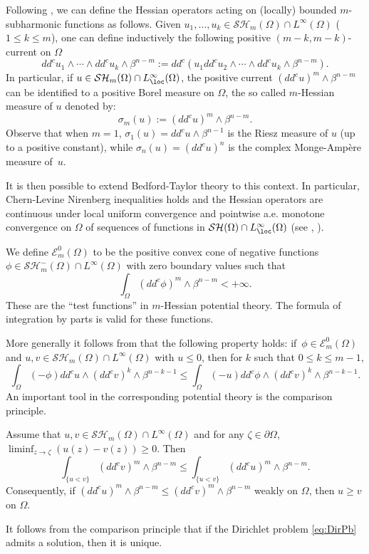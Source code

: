 Following \cite{Bl05}, we can define the Hessian operators acting on (locally) bounded $m$-subharmonic functions as follows. Given $u_1,\dots, u_k \in \mathcal{SH}_m (\Omega) \cap L^{\infty} (\Omega)$ ($1 \leq k \leq m$), one can define inductively the following positive $(m-k,m-k)$-current on $\Omega$
\[
dd^c u_1 \wedge \cdots \wedge dd^c u_k \wedge \beta^{n - m}:= dd^c (u_1 dd^c u_2 \wedge \cdots \wedge dd^c u_k \wedge \beta^{n - m}).
\]
In particular, if $u \in \mathcal{SH}_m (\Omega) \cap L^{\infty}_{\loc} (\Omega)$, the positive current $(dd^c u)^m \wedge \beta^{n-m}$ can be identified to a positive Borel measure on $\Omega$, the so called $m$-Hessian measure of $u$ denoted by:
\[
\sigma_m (u):= (dd^c u)^m \wedge \beta^{n-m}.
\]
Observe that when $m\!=\! 1$, $\sigma_1 (u) \!=\! dd^c u \wedge \beta^{n-1}$ is the Riesz measure of $u$ (up to a positive constant), while $\sigma_n (u) \!=\! (dd^c u)^n$ is the complex Monge-Ampère measure of~$u$.

It is then possible to extend Bedford-Taylor theory to this context.
In particular, Chern-Levine Nirenberg inequalities holds and the Hessian operators are continuous under local uniform convergence and pointwise a.e. monotone convergence
on $\Omega$ of sequences of functions in $\mathcal{SH} (\Omega) \cap L^{\infty}_{\loc} (\Omega)$ (see \cite{Bl05}, \cite{Lu12}).

We define $\mathcal{E}_m^0 (\Omega) $ to be the positive convex cone of negative functions $\phi \in \mathcal{SH}^-_m (\Omega) \cap L^{\infty} (\Omega)$ with zero boundary values such that
\[
\int_{\Omega} (dd^c \phi)^m \wedge \beta^{n - m} < + \infty.
\]
These are the ``test functions'' in $m$-Hessian potential theory. The formula of integration by parts is valid for these functions.

More generally it follows from \cite{Lu12,Lu15} that the following property holds: if~$\phi \in \mathcal{E}_m^0 (\Omega) $ and $u, v \in \mathcal{SH}_m (\Omega) \cap L^{\infty} (\Omega)$ with $u \leq 0$, then for $k$ such that $0 \leq k \leq m - 1$,
\begin{equation} \label{eq:testinequality}
\int_\Omega (-\phi) dd^c u \wedge (dd^c v)^k \wedge \beta^{n - k-1} \leq \int_\Omega (-u) dd^c \phi \wedge (dd^c v)^k \wedge \beta^{n - k-1}.
\end{equation}
An important tool in the corresponding potential theory is the comparison principle.

\begin{proposition} \label{prop:comparison principle}
Assume that $u,v\in \mathcal{SH}_m(\Omega)\cap L^{\infty}(\Omega)$ and for any $\zeta \in \partial \Omega$, $\liminf_{z \to \zeta }(u(z)- v(z))\geq 0$. Then
\[
\int_{\{u<v\}}(dd^c v)^m\wedge\beta^{n-m} \leq \int_{\{u<v\}}(dd^c u)^m\wedge\beta^{n-m}.
\]
Consequently, if $(dd^cu)^m\wedge\beta^{n-m}\leq(dd^cv)^m\wedge\beta^{n-m}$ weakly on $\Omega$, then $u \geq v$ on $\Omega$.

\end{proposition}
It follows from the comparison principle that if the Dirichlet problem \eqref{eq:DirPb} admits a solution, then it is unique.

